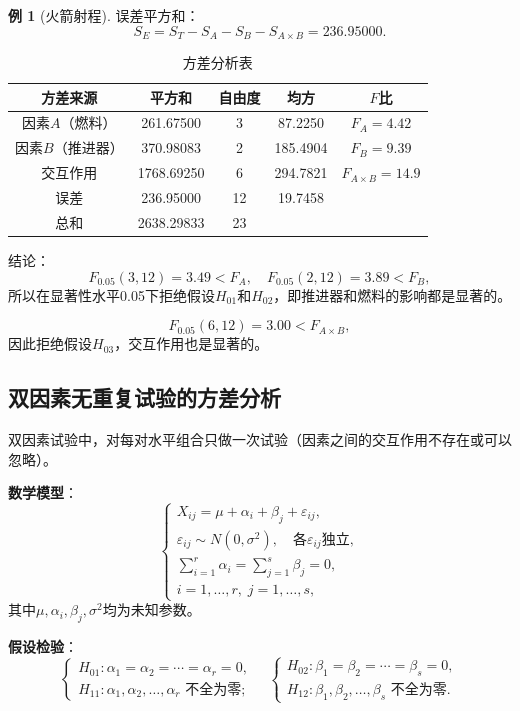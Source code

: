 \documentclass[11pt,a4paper]{report}
\theoremstyle{definition}
\newtheorem{example}{例}[chapter]
\begin{document}
\begin{example}[火箭射程]
误差平方和：
\[
S_{E}=S_{T}-S_{A}-S_{B}-S_{A\times B}=236.95000.
\]

\begin{table}[htbp]
\centering
\caption{方差分析表}
\begin{tabular}{@{}ccccc@{}}
\toprule
方差来源 & 平方和 & 自由度 & 均方 & $F$比 \\
\midrule
因素$A$（燃料） & 261.67500 & 3 & 87.2250 & $F_{A}=4.42$ \\
因素$B$（推进器） & 370.98083 & 2 & 185.4904 & $F_{B}=9.39$ \\
交互作用 & 1768.69250 & 6 & 294.7821 & $F_{A\times B}=14.9$ \\
误差 & 236.95000 & 12 & 19.7458 & \\
总和 & 2638.29833 & 23 & & \\
\bottomrule
\end{tabular}
\end{table}

结论：
\[
F_{0.05}(3,12)=3.49<F_{A},\quad F_{0.05}(2,12)=3.89<F_{B},
\]
所以在显著性水平0.05下拒绝假设$H_{01}$和$H_{02}$，即推进器和燃料的影响都是显著的。

\[
F_{0.05}(6,12)=3.00<F_{A\times B},
\]
因此拒绝假设$H_{03}$，交互作用也是显著的。
\end{example}

\subsection{双因素无重复试验的方差分析}

双因素试验中，对每对水平组合只做一次试验（因素之间的交互作用不存在或可以忽略）。

\textbf{数学模型}：
\[
\begin{cases}
X_{ij}=\mu+\alpha_{i}+\beta_{j}+\varepsilon_{ij},\\[0.3em]
\varepsilon_{ij}\sim N(0,\sigma^{2}),\quad\text{各}\varepsilon_{ij}\text{独立},\\[0.3em]
\displaystyle\sum_{i=1}^{r}\alpha_{i}=\sum_{j=1}^{s}\beta_{j}=0,\\[0.5em]
i=1,\ldots,r,\;j=1,\ldots,s,
\end{cases}
\]
其中$\mu,\alpha_{i},\beta_{j},\sigma^{2}$均为未知参数。

\textbf{假设检验}：
\[
\begin{cases}
H_{01}\colon\alpha_{1}=\alpha_{2}=\cdots=\alpha_{r}=0,\\[0.3em]
H_{11}\colon\alpha_{1},\alpha_{2},\ldots,\alpha_{r}\text{ 不全为零};
\end{cases}
\quad
\begin{cases}
H_{02}\colon\beta_{1}=\beta_{2}=\cdots=\beta_{s}=0,\\[0.3em]
H_{12}\colon\beta_{1},\beta_{2},\ldots,\beta_{s}\text{ 不全为零}.
\end{cases}
\]
\end{document}
